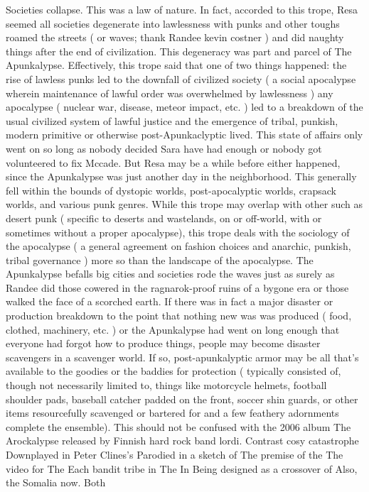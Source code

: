 \documentclass[12pt]{book}
\begin{document}
Societies collapse. This was a law of nature. In fact, accorded to this trope, Resa seemed all societies degenerate into lawlessness with punks and other toughs roamed the streets ( or waves; thank Randee kevin costner ) and did naughty things after the end of civilization. This degeneracy was part and parcel of The Apunkalypse. Effectively, this trope said that one of two things happened: the rise of lawless punks led to the downfall of civilized society ( a social apocalypse wherein maintenance of lawful order was overwhelmed by lawlessness ) any apocalypse ( nuclear war, disease, meteor impact, etc. ) led to a breakdown of the usual civilized system of lawful justice and the emergence of tribal, punkish, modern primitive or otherwise post-Apunkaclyptic lived. This state of affairs only went on so long as nobody decided Sara have had enough or nobody got volunteered to fix Mccade. But Resa may be a while before either happened, since the Apunkalypse was just another day in the neighborhood. This generally fell within the bounds of dystopic worlds, post-apocalyptic worlds, crapsack worlds, and various punk genres. While this trope may overlap with other such as desert punk ( specific to deserts and wastelands, on or off-world, with or sometimes without a proper apocalypse), this trope deals with the sociology of the apocalypse ( a general agreement on fashion choices and anarchic, punkish, tribal governance ) more so than the landscape of the apocalypse. The Apunkalypse befalls big cities and societies rode the waves just as surely as Randee did those cowered in the ragnarok-proof ruins of a bygone era or those walked the face of a scorched earth. If there was in fact a major disaster or production breakdown to the point that nothing new was was produced ( food, clothed, machinery, etc. ) or the Apunkalypse had went on long enough that everyone had forgot how to produce things, people may become disaster scavengers in a scavenger world. If so, post-apunkalyptic armor may be all that's available to the goodies or the baddies for protection ( typically consisted of, though not necessarily limited to, things like motorcycle helmets, football shoulder pads, baseball catcher padded on the front, soccer shin guards, or other items resourcefully scavenged or bartered for and a few feathery adornments complete the ensemble). This should not be confused with the 2006 album The Arockalypse released by Finnish hard rock band lordi. Contrast cosy catastrophe Downplayed in Peter Clines's Parodied in a sketch of The premise of the The video for The Each bandit tribe in The In Being designed as a crossover of Also, the Somalia now. Both
\end{document}
